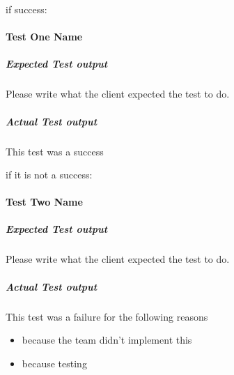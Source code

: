 if success:
\paragraph{Test One Name}
	\subparagraph{Expected Test output}
	Please write what the client expected the test to do.
	
	\subparagraph{Actual Test output}
	This test was a success 
		
if it is not a success:
\paragraph{Test Two Name}
	\subparagraph{Expected Test output}
	Please write what the client expected the test to do.
	
	\subparagraph{Actual Test output}
	This test was a failure for the following reasons
		\begin{itemize}
			\item because the team didn't implement this
			\item because testing
		\end{itemize}